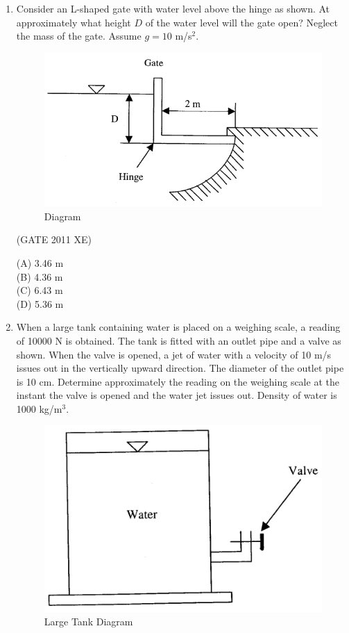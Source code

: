 \documentclass[journal,12pt,onecolumn]{IEEEtran}
\begin{document}
\begin{enumerate}
\begin{enumerate}
\begin{enumerate}
\hfill{(GATE 2011 XE)} \\
\begin{multicols}{4}
(A) 66.5 m/s\\
(B) 81.5 m/s\\
(C) 76.5 m/s\\
(D) 92.5 m/s
\end{multicols}

\newpage

\item Consider an L-shaped gate with water level above the hinge as shown. At approximately what height $D$ of the water level will the gate open? Neglect the mass of the gate. Assume $g = 10$ m/s$^2$.\\

\begin{figure}[htbp]
  \centering
  \includegraphics[width=.65\columnwidth]{figs/B/fig1.png}
  \caption{Diagram}
  \label{fig:figs/B/fig1.png}
\end{figure}


\hfill{(GATE 2011 XE)} \\
\begin{multicols}{4}
(A) 3.46 m\\
(B) 4.36 m\\
(C) 6.43 m\\
(D) 5.36 m
\end{multicols}

\item When a large tank containing water is placed on a weighing scale, a reading of 10000 N is obtained. The tank is fitted with an outlet pipe and a valve as shown. When the valve is opened, a jet of water with a velocity of 10 m/s issues out in the vertically upward direction. The diameter of the outlet pipe is 10 cm. Determine approximately the reading on the weighing scale at the instant the valve is opened and the water jet issues out. Density of water is 1000 kg/m$^3$.\\

\begin{figure}[htbp]
  \centering
  \includegraphics[width=.35\columnwidth]{figs/B/fig2.png}
  \caption{Large Tank Diagram}
  \label{fig:figs/B/fig2.png}
\end{figure}


\end{enumerate}
\end{enumerate}
\end{enumerate}
\end{document}
